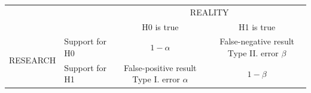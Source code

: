 \begin{table}[ht]
\centering
\begin{tabular}{|c|l|c|c|}
  \hline
\multicolumn{2}{c|}{} & \multicolumn{2}{c|}{REALITY} \\
 & & H0 is true & H1 is true \\
\hline
 \multirow{2}{*}{RESEARCH} & Support for H0 & $1-\alpha$ & \shortstack{False-negative result \\ Type II. error \\ $\beta$} \\ 
   \cline{2-4}
 & Support for H1 & \shortstack{False-positive result \\ Type I. error \\ $\alpha$} & $1-\beta$ \\ 
   \hline
\end{tabular}
\end{table}
